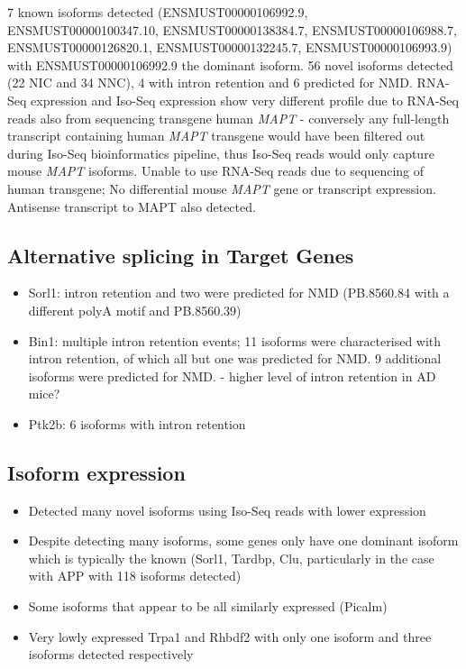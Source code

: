 7 known isoforms detected (ENSMUST00000106992.9, ENSMUST00000100347.10, ENSMUST00000138384.7, ENSMUST00000106988.7, ENSMUST00000126820.1, ENSMUST00000132245.7, ENSMUST00000106993.9) with ENSMUST00000106992.9 the dominant isoform. 
56 novel isoforms detected (22 NIC and 34 NNC), 4 with intron retention and 6 predicted for NMD.  
RNA-Seq expression and Iso-Seq expression show very different profile due to RNA-Seq reads also from sequencing transgene human \textit{MAPT} - conversely any full-length transcript containing human \textit{MAPT} transgene would have been filtered out during Iso-Seq bioinformatics pipeline, thus Iso-Seq reads would only capture mouse \textit{MAPT} isoforms. Unable to use RNA-Seq reads due to sequencing of human transgene; No differential mouse \textit{MAPT} gene or transcript expression. 
Antisense transcript to MAPT also detected.


\subsection{Alternative splicing in Target Genes}
\begin{itemize}
	\item Sorl1: intron retention and two were predicted for NMD (PB.8560.84 with a different polyA motif and PB.8560.39)
	\item Bin1: multiple intron retention events; 11 isoforms were characterised with intron retention, of which all but one was predicted for NMD. 9 additional isoforms were predicted for NMD. - higher level of intron retention in AD mice?
	\item Ptk2b: 6 isoforms with intron retention
\end{itemize}


\subsection{Isoform expression}
\begin{itemize}
	\item Detected many novel isoforms using Iso-Seq reads with lower expression
	\item Despite detecting many isoforms, some genes only have one dominant isoform which is typically the known (Sorl1, Tardbp, Clu, particularly in the case with APP with 118 isoforms detected)
	\item Some isoforms that appear to be all similarly expressed (Picalm)
	\item Very lowly expressed Trpa1 and Rhbdf2 with only one isoform and three isoforms detected respectively
\end{itemize}

